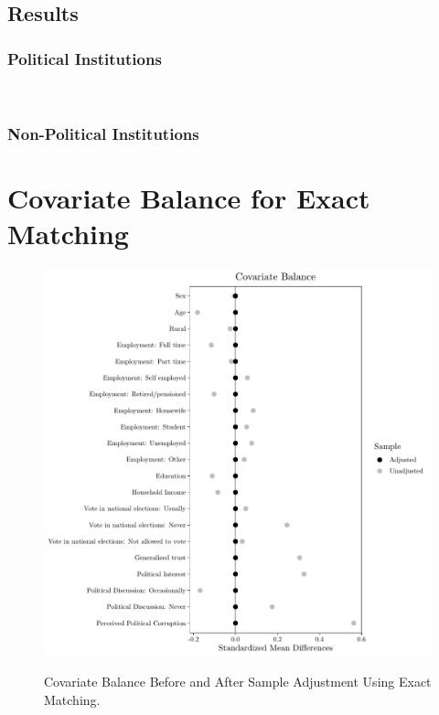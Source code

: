 \documentclass[11pt, ngerman,english,a4]{article}
\begin{document}
\subsection{Results}

\subsubsection*{Political Institutions}



\newpage
\\


\newpage
\begin{landscape}
\subsubsection*{Non-Political Institutions}


\end{landscape}

\begin{landscape}


\end{landscape}

\normalsize

\section*{Covariate Balance for Exact Matching}

\begin{figure}[H]
    \caption{Covariate Balance Before and After Sample Adjustment Using Exact Matching.}
    \centering
    \includegraphics[width=0.9\linewidth]{covbalance_exact.pdf}
    \label{fig:balance}
\end{figure}
\end{document}
